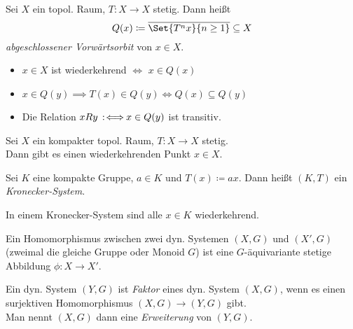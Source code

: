 \documentclass{cheat-sheet}
\newcommand{\clos}[1]{\overline{#1}} %
\begin{document}
\begin{defn}
  Sei $X$ ein topol. Raum, $T : X \to X$ stetig. Dann heißt
  \[ Q(x) \coloneqq \clos{\Set{T^n x}{n \geq 1}} \subseteq X \]
  \emph{abgeschlossener Vorwärtsorbit} von $x \in X$.
\end{defn}

\begin{lem}
  \begin{itemize}
    \item $x \in X$ ist wiederkehrend $\iff$ $x \in Q(x)$
    \item $x \in Q(y) \implies T(x) \in Q(y) \iff Q(x) \subseteq Q(y)$
    \item Die Relation $xRy \!\!\enspace:\!\iff\!\! x \in Q(y)$ ist transitiv.
  \end{itemize}
\end{lem}

\begin{thm}
  Sei $X$ ein kompakter topol. Raum, $T : X \to X$ stetig. \\
  Dann gibt es einen wiederkehrenden Punkt $x \in X$.
\end{thm}

\begin{defn}
  Sei $K$ eine kompakte Gruppe, $a \in K$ und $T(x) \coloneqq ax$. Dann heißt $(K, T)$ ein \emph{Kronecker-System}.
\end{defn}

\begin{thm}
  In einem Kronecker-System sind alle $x \in K$ wiederkehrend.
\end{thm}


\begin{defn}
  Ein Homomorphismus zwischen zwei dyn. Systemen $(X, G)$ und $(X', G)$ (zweimal die gleiche Gruppe oder Monoid $G$) ist eine $G$-äquivariante stetige Abbildung $\phi : X \to X'$.
\end{defn}

\begin{defn}
  Ein dyn. System $(Y, G)$ ist \emph{Faktor} eines dyn. System $(X, G)$, wenn es einen surjektiven Homomorphismus $(X, G) \to (Y, G)$ gibt. \\
  Man nennt $(X, G)$ dann eine \emph{Erweiterung} von $(Y, G)$.
\end{defn}
\end{document}
